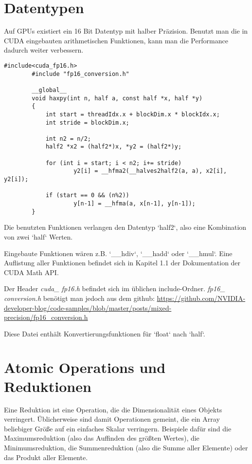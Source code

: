 		
		\section{Datentypen}
		Auf GPUs existiert ein 16 Bit Datentyp mit halber Präzision. Benutzt man die in CUDA eingebauten arithmetischen Funktionen, kann man die Performance dadurch weiter verbessern.			
		\begin{lstlisting}[caption=~Half Precision]
		#include<cuda_fp16.h>
		#include "fp16_conversion.h"
		
		__global__
		void haxpy(int n, half a, const half *x, half *y)
		{
    		int start = threadIdx.x + blockDim.x * blockIdx.x;
    		int stride = blockDim.x;

			int n2 = n/2;
			half2 *x2 = (half2*)x, *y2 = (half2*)y;

			for (int i = start; i < n2; i+= stride) 
					y2[i] = __hfma2(__halves2half2(a, a), x2[i], y2[i]);

			if (start == 0 && (n%2))
					y[n-1] = __hfma(a, x[n-1], y[n-1]);
		}
		\end{lstlisting}
		
	    Die benutzten Funktionen verlangen den Datentyp \li`half2`, also eine Kombination von zwei \li`half` Werten.
	    
		Eingebaute Funktionen wären z.B. \li`__hdiv`, \li`__hadd` oder \li`__hmul`. Eine Auflistung aller Funktionen befindet sich in Kapitel 1.1 der Dokumentation der CUDA Math \Gls{API}. \autocite{cudaMath}
		
		Der Header \textit{cuda\_ fp16.h} befindet sich im üblichen include-Ordner. \textit{fp16\_ conversion.h} benötigt man jedoch aus dem github: \url{https://github.com/NVIDIA-developer-blog/code-samples/blob/master/posts/mixed-precision/fp16_conversion.h}
		
		Diese Datei enthält Konvertierungsfunktionen für \li`float` nach \li`half`.
	
		
		\section{Atomic Operations und Reduktionen}
		Eine Reduktion ist eine Operation, die die Dimensionalität eines Objekts verringert. Üblicherweise sind damit Operationen gemeint, die ein Array beliebiger Größe auf ein einfaches Skalar verringern. Beispiele dafür sind die Maximumsreduktion (also das Auffinden des größten Wertes), die Minimumsreduktion, die Summenreduktion (also die Summe aller Elemente) oder das Produkt aller Elemente. 
		
